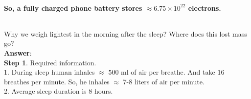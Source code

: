 \documentclass[11pt]{exam}
\begin{document}
\begin{questions}
 \\ 

\textbf{So, a fully charged phone battery stores $\approx 6.75 \times 10^{22}$ electrons.}\\ \\

%
%
                

\question
\label{Q9:Lightest morning}

Why we weigh lightest in the morning after the sleep? Where does this lost mass go? \\
\textbf{Answer}: \\
\textbf{Step 1}. Required information.\\
               1. During sleep human inhales $\approx$ 500 ml of air per breathe. And take 16 breathes per minute. So, he inhales $\approx$ 7-8 liters of air per minute. \\
               2. Average sleep duration is 8 hours.  \\ 
               

\end{questions}
\end{document}
